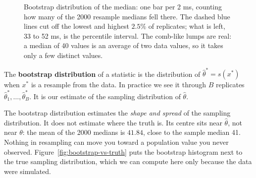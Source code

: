 \begin{figure}[H]
\centering
{}
\caption{Bootstrap distribution of the median: one bar per 2 ms, counting how
many of the 2000 resample medians fell there. The dashed blue lines cut off
the lowest and highest $2.5\%$ of replicates; what is left, 33 to 52 ms, is the
percentile interval. The comb-like lumps are real: a median of 40 values is an
average of two data values, so it takes only a few distinct values.}
\label{fig:bootstrap-median-hist}
\end{figure}

\begin{definition}
The \textbf{bootstrap distribution} of a statistic is the distribution of
$\hat\theta^* = s(x^*)$ when $x^*$ is a resample from the data. In practice we
see it through $B$ replicates $\hat\theta^*_1, \dots, \hat\theta^*_B$. It is our
estimate of the sampling distribution of $\hat\theta$.
\end{definition}

The bootstrap distribution estimates the \emph{shape and spread} of the
sampling distribution. It does not estimate where the truth is. Its centre sits
near $\hat\theta$, not near $\theta$: the mean of the 2000 medians is $41.84$,
close to the sample median 41. Nothing in resampling can move you toward a
population value you never observed. Figure~\ref{fig:bootstrap-vs-truth} puts
the bootstrap histogram next to the true sampling distribution, which we can
compute here only because the data were simulated.

